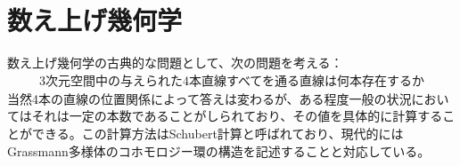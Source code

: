 \documentclass{ltjsreport}
\begin{document}
  \chapter{数え上げ幾何学}

  数え上げ幾何学の古典的な問題として、次の問題を考える：
  \begin{align}
    \text{3次元空間中の与えられた4本直線すべてを通る直線は何本存在するか}
  \end{align}
  当然4本の直線の位置関係によって答えは変わるが、ある程度一般の状況においてはそれは一定の本数であることがしられており、その値を具体的に計算することができる。この計算方法はSchubert計算と呼ばれており、現代的にはGrassmann多様体のコホモロジー環の構造を記述することと対応している。
  
\end{document}
